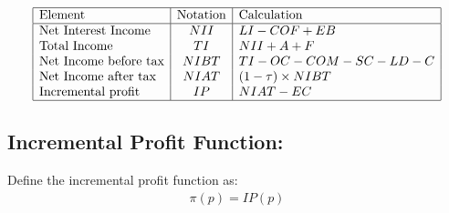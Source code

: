 \renewcommand{\arraystretch}{1.5} %
\begin{center} %
\[ %
\begin{array}{|l|c|l|} \hline %
\mbox{Element} & \mbox{Notation} & \mbox{Calculation}\\ \hline
\mbox{Net Interest Income }  & NII & LI-COF+EB\\
\mbox{Total Income  }  & TI & NII+A+F\\
\mbox{Net Income before tax}  & NIBT & TI-OC-COM-SC-LD-C\\
\mbox{Net Income after tax }  & NIAT&(1-\tau)\times NIBT \\
\mbox{Incremental profit  }  & IP & NIAT-EC\\

\hline
\end{array} %
\] %
\end{center}

\subsection{ Incremental Profit Function: }
Define the incremental profit function as:
\begin{align}
\pi(p)=IP(p) \label{eq:IP}
\end{align}
